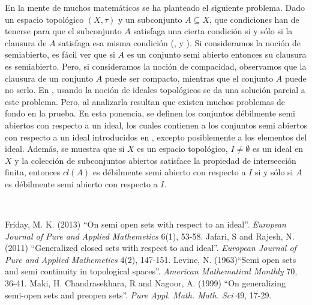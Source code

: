\begin{titlepage}
\begin{minipage}{0.85\linewidth}
\begin{minipage}{0.85\linewidth}
\begin{resumen}
En la mente de muchos matem\'{a}ticos se ha planteado el siguiente problema. Dado un espacio topol\'{o}gico $(X,\tau)$ y un subconjunto $A\subseteq X$, que condiciones han de tenerse para que el subconjunto $A$ satisfaga una cierta condici\'{o}n si y s\'{o}lo si la clausura de $A$ satisfaga esa misma condici\'{o}n (\cite{SJNR}, \cite{NL1} y \cite{MA}). Si consideramos la noci\'{o}n de semiabierto, es f\'{a}cil ver que si $A$ es un conjunto semi abierto entonces su clausura es semiabierto. Pero, si consideramos la noci\'{o}n de compacidad, observamos que la clausura de un conjunto $A$ puede ser compacto, mientras que el conjunto $A$ puede no serlo. En \cite{FRM}, usando la noci\'{o}n de ideales topol\'{o}gicos se da una soluci\'{o}n parcial a este problema. Pero, al analizarla resultan que existen muchos problemas de fondo en la prueba. En esta ponencia, se definen los conjuntos d\'{e}bilmente semi abiertos con respecto a un ideal, los cuales contienen a los conjuntos semi abiertos con respecto a un ideal introducidos en \cite{FRM}, excepto posiblemente a los elementos del ideal. Adem\'{a}s, se muestra que si $X$ es un espacio topol\'{o}gico, $I\neq\emptyset$ es un ideal en $X$ y la colecci\'{o}n de subconjuntos abiertos satisface la propiedad de intersecci\'{o}n finita, entonces $cl(A)$ es d\'{e}bilmente semi abierto con respecto a $I$ si y s\'{o}lo si $A$ es d\'{e}bilmente semi abierto con respecto a $I$.
    \end{resumen}
   \end{minipage}
   \vspace{10pt}
\end{minipage}
\vspace{10pt}\\[5pt]
\begin{thebibliography}{99}
 {\sc Friday, M. K.} (2013) ``On semi open sets with respect to an ideal''. \emph{European Journal of Pure and Applied Mathemetics} 6(1), 53-58.
 {\sc Jafari, S and Rajesh, N.} (2011) ``Generalized closed sets with respect to and ideal''. \emph{European Journal of Pure and Applied Mathemetics} 4(2), 147-151.
 {\sc Levine, N. }(1963)``Semi open sets and semi continuity in topological spaces''. \emph{American Mathematical Monthly} 70, 36-41.
 {\sc Maki, H. Chandrasekhara, R and Nagoor, A.} (1999) ``On generalizing semi-open sets and preopen sets''. \emph{Pure Appl. Math. Math. Sci} 49, 17-29.
\end{thebibliography}
\end{titlepage}
